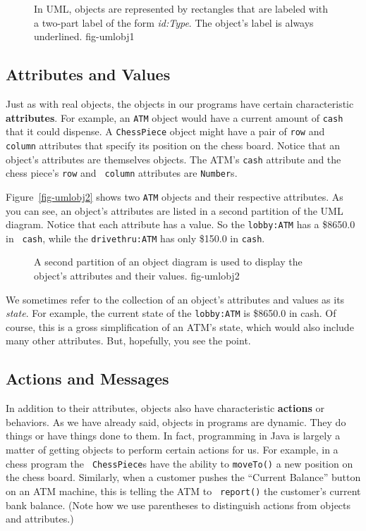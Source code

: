 \begin{figure}[tb]
 {In UML, objects are represented by
rectangles that are labeled with a two-part label of the form {\it
id:Type}. The object's label is always underlined.
} {fig-umlobj1}

\end{figure}

\subsection{Attributes and Values}

Just as with real objects, the objects in our programs have certain
characteristic {\bf attributes}. For example, an {\tt ATM} object
would have a current amount of {\tt cash} that it could dispense. A
{\tt ChessPiece} object might have a pair of {\tt row} and {\tt
column} attributes that specify its position on the chess
board. Notice that an object's attributes are themselves objects. The
ATM's {\tt cash} attribute and the chess piece's {\tt row} and {\tt
column} attributes are {\tt Number}s.

Figure~\ref{fig-umlobj2} shows two {\tt ATM} objects and their
respective attributes. As you can see, an object's attributes are
listed in a second partition of the UML diagram. Notice that each
attribute has a value. So the {\tt lobby:ATM} has a \$8650.0 in {\tt
cash}, while the {\tt drivethru:ATM} has only \$150.0 in {\tt cash}.

\begin{figure}[h]
{A second partition of an object diagram is used to display
the object's attributes and their values. 
} {fig-umlobj2}

\end{figure}

We sometimes refer to the collection of an object's attributes and
values as its {\it state}. For example, the current state of the
{\tt lobby:ATM} is \$8650.0 in cash.  Of course, this is a gross
simplification of an ATM's state, which would also include many other
attributes. But, hopefully, you see the point.

\subsection{Actions and Messages}

In addition to their attributes, objects also have characteristic {\bf
actions} or behaviors. As we have already said, objects in programs
are dynamic. They do things or have things done to them. In fact,
programming in Java is largely a matter of getting objects to perform
certain actions for us.  For example, in a chess program the {\tt
ChessPiece}s have the ability to {\tt moveTo()} a new position on the
chess board.  Similarly, when a customer pushes the ``Current
Balance'' button on an ATM machine, this is telling the ATM to {\tt
report()} the customer's current bank balance. (Note how we use
parentheses to distinguish actions from objects and attributes.)

